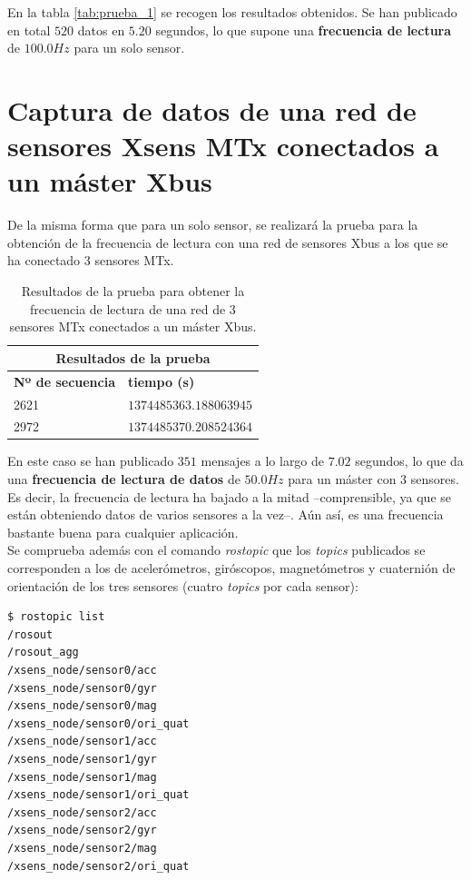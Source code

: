 \documentclass[12pt, a4paper]{report}
\begin{document}
En la tabla \ref{tab:prueba_1} se recogen los resultados obtenidos. Se han publicado en total $520$ datos en $5.20$ segundos, lo que supone una \textbf{frecuencia de lectura} de $100.0 Hz$ para un solo sensor.

\section{Captura de datos de una red de sensores Xsens MTx conectados a un máster Xbus}

De la misma forma que para un solo sensor, se realizará la prueba para la obtención de la frecuencia de lectura con una red de sensores Xbus a los que se ha conectado 3 sensores MTx.

\begin{table}[h]
\footnotesize
\center
\begin{tabular}{|l|l|}
\hline
\multicolumn{2}{|c|}{\textbf{Resultados de la prueba}}\\
\hline
\textbf{Nº de secuencia} & \textbf{tiempo (s)} \\ 
\hline
2621 & $1374485363.188063945$ \\
2972 & $1374485370.208524364$ \\
\hline
\end{tabular}	
\caption[Resultados de la prueba para obtener la frecuencia de lectura de una red de 3 sensores MTx conectados a un máster Xbus]{Resultados de la prueba para obtener la frecuencia de lectura de una red de 3 sensores MTx conectados a un máster Xbus.}
\label{tab:prueba_2}	
\end{table}

En este caso se han publicado $351$ mensajes a lo largo de $7.02$ segundos, lo que da una \textbf{frecuencia de lectura de datos} de $50.0 Hz$ para un máster con 3 sensores. Es decir, la frecuencia de lectura ha bajado a la mitad --comprensible, ya que se están obteniendo datos de varios sensores a la vez--. Aún así, es una frecuencia bastante buena para cualquier aplicación.\\

Se comprueba además con el comando \textit{rostopic} que los \textit{topics} publicados se corresponden a los de acelerómetros, giróscopos, magnetómetros y cuaternión de orientación de los tres sensores (cuatro \textit{topics} por cada sensor):

\begin{verbatim}
$ rostopic list
/rosout
/rosout_agg
/xsens_node/sensor0/acc
/xsens_node/sensor0/gyr
/xsens_node/sensor0/mag
/xsens_node/sensor0/ori_quat
/xsens_node/sensor1/acc
/xsens_node/sensor1/gyr
/xsens_node/sensor1/mag
/xsens_node/sensor1/ori_quat
/xsens_node/sensor2/acc
/xsens_node/sensor2/gyr
/xsens_node/sensor2/mag
/xsens_node/sensor2/ori_quat
\end{verbatim}
\end{document}

